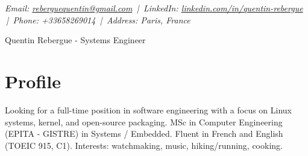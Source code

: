 \documentclass[9pt,a4paper]{article}
\newcommand{\namefont}{\fontsize{18}{22}\selectfont}
\newcommand{\tinyscript}{\fontsize{8}{8}\selectfont}
\begin{document}
\renewcommand\normalsize{\fontsize{10.5}{15}\selectfont}
\normalsize

\begin{center}
  {\tinyscript\itshape
  Email: \href{mailto:reberguequentin@gmail.com}{reberguequentin@gmail.com} \,|\,
  LinkedIn: \href{https://linkedin.com/in/quentin-rebergue}{linkedin.com/in/quentin-rebergue} \,|\,
  Phone: +33658269014 \,|\,
  Address: Paris, France}
\end{center}

\begin{center}
  {\namefont Quentin Rebergue - Systems Engineer}
\end{center}

\section*{Profile}
\begin{tcolorbox}[mybox2]
Looking for a full-time position in software engineering with a focus on Linux systems, kernel, and open-source packaging. MSc in Computer Engineering (EPITA - GISTRE) in Systems / Embedded. Fluent in French and English (TOEIC 915, C1). Interests: watchmaking, music, hiking/running, cooking.
\end{tcolorbox}
\end{document}

